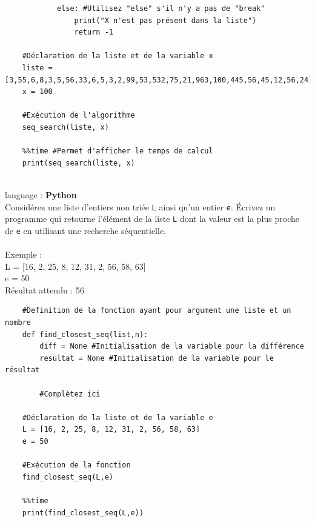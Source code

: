 \begin{Exercice}[5 minutes]
\begin{verbatim}
            else: #Utilisez "else" s'il n'y a pas de "break"
                print("X n'est pas présent dans la liste")
                return -1
    
    #Déclaration de la liste et de la variable x 
    liste = [3,55,6,8,3,5,56,33,6,5,3,2,99,53,532,75,21,963,100,445,56,45,12,56,24]
    x = 100
    
    #Exécution de l'algorithme
    seq_search(liste, x)
    
    %%time #Permet d'afficher le temps de calcul
    print(seq_search(liste, x)
    
\end{verbatim}

\end{Exercice}

\begin{Exercice}[10 minutes] language : \textbf{Python}\\

Considérez une liste d’entiers non triée \lstinline{L} ainsi qu’un entier \lstinline{e}. Écrivez un programme qui retourne l'élément de la liste \lstinline{L} dont la valeur est la plus proche de \lstinline{e} en utilisant une recherche séquentielle.\\\\
Exemple :\\
L = [16, 2, 25, 8, 12, 31, 2, 56, 58, 63]\\
e = 50\\
Résultat attendu : 56\\

\begin{verbatim}
    #Definition de la fonction ayant pour argument une liste et un nombre 
    def find_closest_seq(list,n):
        diff = None #Initialisation de la variable pour la différence
        resultat = None #Initialisation de la variable pour le résultat
    
        #Complètez ici
        
    #Déclaration de la liste et de la variable e
    L = [16, 2, 25, 8, 12, 31, 2, 56, 58, 63] 
    e = 50

    #Exécution de la fonction
    find_closest_seq(L,e)
    
    %%time 
    print(find_closest_seq(L,e))

\end{verbatim}


\end{Exercice}
